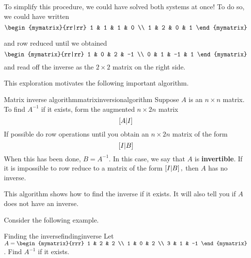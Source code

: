 To simplify this procedure, we could have solved both systems at once!
To do so, we could have written
\begin{equation*}
\begin{mymatrix}{rr|rr}
1 & 1 & 1 & 0 \\
1 & 2 & 0 & 1
\end{mymatrix}
\end{equation*}

and row reduced until we obtained
\begin{equation*}
\begin{mymatrix}{rr|rr}
1 & 0 & 2 & -1 \\
0 & 1 & -1 & 1
\end{mymatrix}
\end{equation*}
and read off the inverse as the $2\times 2$ matrix on the right side.

This exploration motivates the following important algorithm.

\begin{algorithm}{Matrix inverse algorithm}{matrixinversionalgorithm}
Suppose $A$ is an $n\times n$ matrix. To find $A^{-1}$ if it exists, form
the augmented $n\times 2n$ matrix
\begin{equation*}
\left[A|I\right]
\end{equation*}
If possible do row operations until you obtain an $n\times 2n$
matrix of the form
\begin{equation*}
\left[I|B\right]  
\end{equation*}
When this has been done, $B=A^{-1}.$ In this case, we say that $A$ is \textbf{invertible}. 
If it is impossible to row reduce to a
matrix of the form $\left[I|B\right] ,$ then $A$ has no inverse.
\end{algorithm}

This algorithm shows how to find the inverse if it exists. It will also tell you if
$A$ does not have an inverse. 

Consider the following example.

\begin{example}{Finding the inverse}{findinginverse}
Let $A=\begin{mymatrix}{rrr}
1 & 2 & 2 \\
1 & 0 & 2 \\
3 & 1 & -1
\end{mymatrix} $. Find $A^{-1}$ if it exists.
\end{example}

